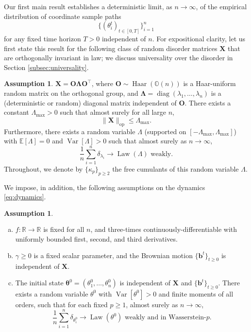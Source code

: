 \documentclass[11pt,letterpaper,reqno]{amsart}
\def\E{\mathbb{E}}
\def\R{\mathbb{R}}
\def\OO{\mathbb{O}}
\def\btheta{\boldsymbol{\theta}}
\def\bLambda{\boldsymbol{\Lambda}}
\def\X{\mathbf{X}}
\def\O{\mathbf{O}}
\def\b{\mathbf{b}}
\def\diag{\operatorname{diag}}
\def\Haar{\operatorname{Haar}}
\def\Law{\operatorname{Law}}
\def\Var{\operatorname{Var}}
\def\op{\mathrm{op}}
\theoremstyle{definition}
\newtheorem{assumption}[theorem]{Assumption}
\numberwithin{equation}{section}
\begin{document}
Our first main result establishes a deterministic limit, as $n \to \infty$,
of the empirical distribution of coordinate sample paths
\[\{(\theta_i^t)_{t \in [0,T]}\}_{i=1}^n\]
for any fixed time horizon $T>0$ independent of $n$. For expositional clarity, let us first state
this result for the following class of random disorder matrices $\X$ that 
are orthogonally invariant in law; we discuss universality over the disorder in
Section \ref{subsec:universality}.

\begin{assumption}\label{assump:X}
$\X=\O\bLambda\O^\top$, where $\O \sim \Haar(\OO(n))$ is a Haar-uniform
random matrix on the orthogonal group, and
$\bLambda=\diag(\lambda_1,\ldots,\lambda_n)$ is a (deterministic or random)
diagonal matrix independent of $\O$. There exists a constant $\Lambda_{\max}>0$
such that almost surely for all large $n$,
\[\|\X\|_\op \leq \Lambda_{\max}.\]
Furthermore, there exists a random variable $\Lambda$ (supported on
$[-\Lambda_{\max},\Lambda_{\max}]$) with $\E[\Lambda]=0$ and $\Var[\Lambda]>0$
such that almost surely as $n \to \infty$,
\[\frac{1}{n}\sum_{i=1}^n \delta_{\lambda_i} \to \Law(\Lambda)
\text{ weakly.}\]
Throughout, we denote by
$\{\kappa_p\}_{p \geq 2}$ the free cumulants of this random variable $\Lambda$.
\end{assumption}
 

We impose, in addition, the following assumptions on the
dynamics \eqref{eq:dynamics}.

\begin{assumption}\label{assump:dynamics}
\begin{enumerate}[(a)]
\item $f:\R \to \R$ is fixed for all $n$, and three-times continuously-differentiable
with uniformly bounded first, second, and third derivatives.  
\item $\gamma \geq 0$ is a fixed scalar parameter, and
the Brownian motion $\{\b^t\}_{t \geq 0}$ is independent of $\X$.
\item The initial state
$\btheta^0=(\theta_1^0,\ldots,\theta_n^0)$ is independent of $\X$ and
$\{\b^t\}_{t \geq 0}$. There exists a random variable $\theta^0$ with
$\Var[\theta^0]>0$ and finite moments of all orders,
such that for each fixed $p \geq 1$, almost surely as $n \to \infty$,
\[\frac{1}{n}\sum_{i=1}^n \delta_{\theta_i^0} \to \Law(\theta^0) \text{ weakly
and in Wasserstein-$p$.}\]
\end{enumerate}
\end{assumption}
\end{document}
